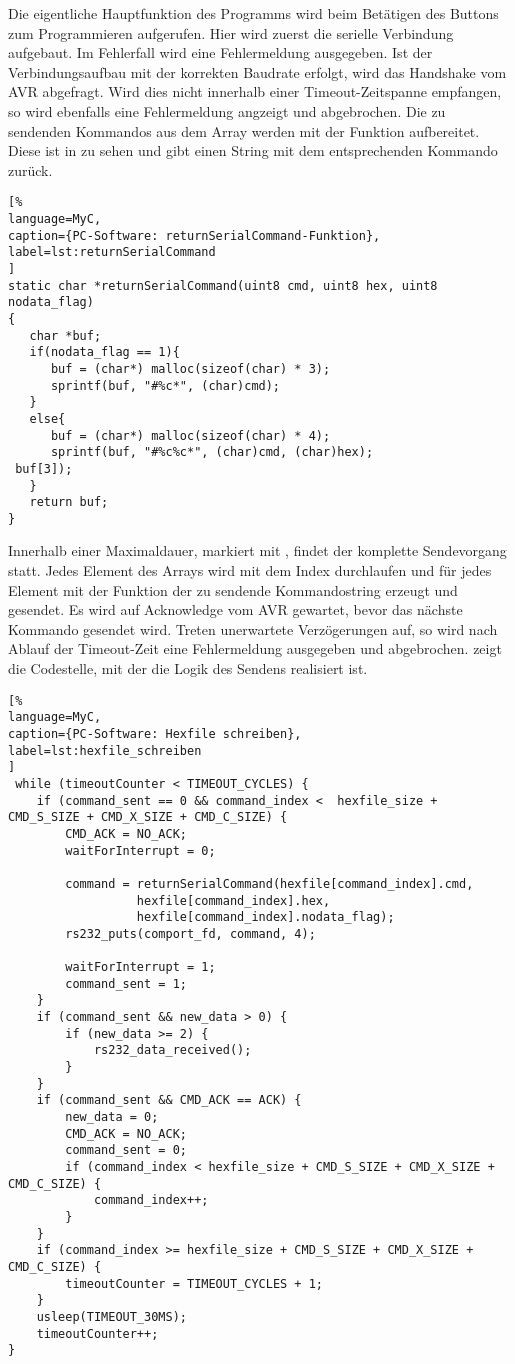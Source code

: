 Die eigentliche Hauptfunktion des Programms wird beim Betätigen des Buttons zum Programmieren aufgerufen. Hier wird zuerst die serielle Verbindung aufgebaut. Im Fehlerfall wird eine Fehlermeldung ausgegeben. Ist der Verbindungsaufbau mit der korrekten Baudrate erfolgt, wird das Handshake vom AVR abgefragt. Wird dies nicht innerhalb einer Timeout-Zeitspanne empfangen, so wird ebenfalls eine Fehlermeldung angzeigt und abgebrochen. Die zu sendenden Kommandos aus dem Array  werden mit der Funktion  aufbereitet. Diese ist in  zu sehen und gibt einen String mit dem entsprechenden Kommando zurück. 
\begin{lstlisting}[%
language=MyC,
caption={PC-Software: returnSerialCommand-Funktion},
label=lst:returnSerialCommand
]
static char *returnSerialCommand(uint8 cmd, uint8 hex, uint8 nodata_flag)
{
   char *buf;
   if(nodata_flag == 1){
      buf = (char*) malloc(sizeof(char) * 3);
      sprintf(buf, "#%c*", (char)cmd);
   }
   else{
      buf = (char*) malloc(sizeof(char) * 4);
      sprintf(buf, "#%c%c*", (char)cmd, (char)hex);
 buf[3]);
   }
   return buf;
}
\end{lstlisting}%
Innerhalb einer Maximaldauer, markiert mit , findet der komplette Sendevorgang statt. \newline
Jedes Element des Arrays  wird mit dem Index  durchlaufen und für jedes Element mit der Funktion  der zu sendende Kommandostring erzeugt und gesendet. Es wird auf Acknowledge vom AVR gewartet, bevor das nächste Kommando gesendet wird. Treten unerwartete Verzögerungen auf, so wird nach Ablauf der Timeout-Zeit eine Fehlermeldung ausgegeben und abgebrochen.  zeigt die Codestelle, mit der die Logik des Sendens realisiert ist. 
\begin{lstlisting}[%
language=MyC,
caption={PC-Software: Hexfile schreiben},
label=lst:hexfile_schreiben
]
 while (timeoutCounter < TIMEOUT_CYCLES) {
    if (command_sent == 0 && command_index <  hexfile_size + CMD_S_SIZE + CMD_X_SIZE + CMD_C_SIZE) {
        CMD_ACK = NO_ACK;
        waitForInterrupt = 0;

        command = returnSerialCommand(hexfile[command_index].cmd,
                  hexfile[command_index].hex,
                  hexfile[command_index].nodata_flag);
        rs232_puts(comport_fd, command, 4);

        waitForInterrupt = 1;
        command_sent = 1;
    }
    if (command_sent && new_data > 0) {
        if (new_data >= 2) {
            rs232_data_received();
        }
    }
    if (command_sent && CMD_ACK == ACK) {
        new_data = 0;
        CMD_ACK = NO_ACK;
        command_sent = 0;
        if (command_index < hexfile_size + CMD_S_SIZE + CMD_X_SIZE + CMD_C_SIZE) {
            command_index++;
        }
    }
    if (command_index >= hexfile_size + CMD_S_SIZE + CMD_X_SIZE + CMD_C_SIZE) {
        timeoutCounter = TIMEOUT_CYCLES + 1;
    }
    usleep(TIMEOUT_30MS);
    timeoutCounter++;
}
\end{lstlisting}%
\newpage
